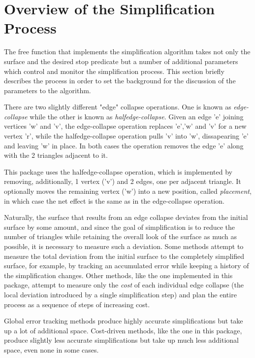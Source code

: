 \section{Overview of the Simplification Process}

The free function that implements the simplification algorithm takes not only the surface
and the desired stop predicate but a number of additional parameters which control and
monitor the simplification process. This section briefly describes the process in order 
to set the background for the discussion of the parameters to the algorithm.

There are two slightly different "edge" collapse operations. One is known as
{\em edge-collapse} while the other is known as {\em halfedge-collapse}.
Given an edge 'e' joining vertices 'w' and 'v', the edge-collapse operation replaces
'e','w' and 'v' for a new vertex 'r', while the halfedge-collapse operation
pulls 'v' into 'w', dissapearing 'e' and leaving 'w' in place.
In both cases the operation removes the edge 'e' along with the 2 triangles 
adjacent to it.

This package uses the halfedge-collapse operation, which is implemented by removing,
additionally, 1 vertex ('v') and 2 edges, one per adjacent triangle.
It optionally moves the remaining vertex ('w') into a new position, 
called {\em placement}, in which case the net effect is the same as in
the edge-collapse operation.


Naturally, the surface that results from an edge collapse deviates from the initial 
surface by some amount, and since the goal of simplification is to reduce the number 
of triangles while retaining the overall look of the surface as much as possible, 
it is necessary to measure such a deviation. Some methods attempt to measure the 
total deviation from the initial surface to the completely simplified surface, 
for example, by tracking an accumulated error while keeping a history of the simplification 
changes. Other methods, like the one implemented in this package, attempt to measure only
the {\em cost} of each individual edge collapse  (the local deviation introduced by
a single simplification step) and plan the entire process as a sequence of steps 
of increasing cost. 

Global error tracking methods produce highly accurate simplifications but take up a lot 
of additional space. Cost-driven methods, like the one in this package, produce slightly 
less accurate simplifications but take up much less additional space, even none in some cases.

